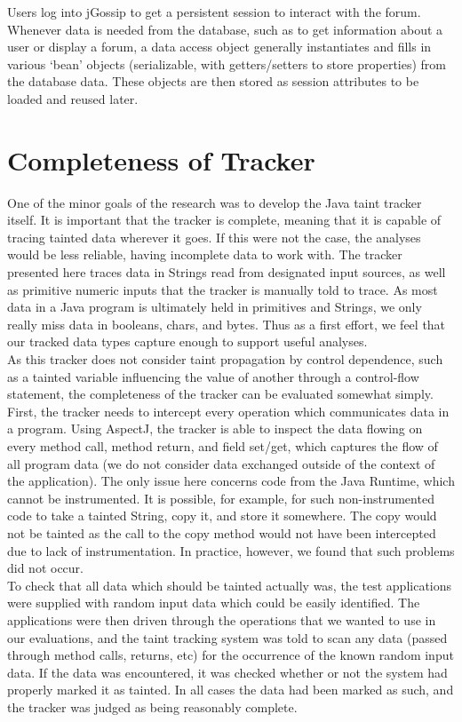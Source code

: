 \documentclass[msc,oneside]{ubcthesis}
\begin{document}
Users log into jGossip to get a persistent session to interact with the forum. Whenever data is needed from the database, such as to get information about a user or display a forum, a data access object generally instantiates and fills in various `bean' objects (serializable, with getters/setters to store properties) from the database data. These objects are then stored as session attributes to be loaded and reused later.

\section{Completeness of Tracker}
One of the minor goals of the research was to develop the Java taint tracker itself. It is important that the tracker is complete, meaning that it is capable of tracing tainted data wherever it goes. If this were not the case, the analyses would be less reliable, having incomplete data to work with. The tracker presented here traces data in Strings read from designated input sources, as well as primitive numeric inputs that the tracker is manually told to trace. As most data in a Java program is ultimately held in primitives and Strings, we only really miss data in booleans, chars, and bytes. Thus as a first effort, we feel that our tracked data types capture enough to support useful analyses. \\

As this tracker does not consider taint propagation by control dependence, such as a tainted variable influencing the value of another through a control-flow statement, the completeness of the tracker can be evaluated somewhat simply.\\

First, the tracker needs to intercept every operation which communicates data in a program. Using AspectJ, the tracker is able to inspect the data flowing on every method call, method return, and field set/get, which captures the flow of all program data (we do not consider data exchanged outside of the context of the application). The only issue here concerns code from the Java Runtime, which cannot be instrumented. It is possible, for example, for such non-instrumented code to take a tainted String, copy it, and store it somewhere. The copy would not be tainted as the call to the copy method would not have been intercepted due to lack of instrumentation. In practice, however, we found that such problems did not occur. \\

To check that all data which should be tainted actually was, the test applications were supplied with random input data which could be easily identified. The applications were then driven through the operations that we wanted to use in our evaluations, and the taint tracking system was told to scan any data (passed through method calls, returns, etc) for the occurrence of the known random input data. If the data was encountered, it was checked whether or not the system had properly marked it as tainted. In all cases the data had been marked as such, and the tracker was judged as being reasonably complete.
\end{document}

